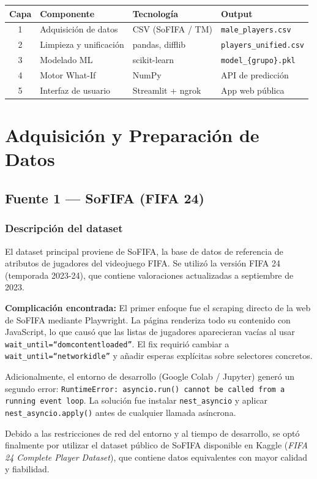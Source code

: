 \documentclass[12pt,a4paper]{report}
\begin{document}
\begin{center}
\begin{tabular}{clll}
\toprule
\textbf{Capa} & \textbf{Componente} & \textbf{Tecnología} & \textbf{Output} \\
\midrule
1 & Adquisición de datos     & CSV (SoFIFA / TM)    & \texttt{male\_players.csv} \\
2 & Limpieza y unificación   & pandas, difflib      & \texttt{players\_unified.csv} \\
3 & Modelado ML              & scikit-learn         & \texttt{model\_\{grupo\}.pkl} \\
4 & Motor What-If            & NumPy                & API de predicción \\
5 & Interfaz de usuario      & Streamlit + ngrok    & App web pública \\
\bottomrule
\end{tabular}
\end{center}


\chapter{Adquisición y Preparación de Datos}

\section{Fuente 1 --- SoFIFA (FIFA 24)}

\subsection{Descripción del dataset}

El dataset principal proviene de SoFIFA, la base de datos de referencia de atributos de jugadores del videojuego FIFA. Se utilizó la versión FIFA 24 (temporada 2023-24), que contiene valoraciones actualizadas a septiembre de 2023.

\begin{warningbox}
\textbf{Complicación encontrada:} El primer enfoque fue el scraping directo de la web de SoFIFA mediante Playwright. La página renderiza todo su contenido con JavaScript, lo que causó que las listas de jugadores aparecieran vacías al usar \texttt{wait\_until=``domcontentloaded''}. El fix requirió cambiar a \texttt{wait\_until=``networkidle''} y añadir esperas explícitas sobre selectores concretos.

Adicionalmente, el entorno de desarrollo (Google Colab / Jupyter) generó un segundo error: \texttt{RuntimeError: asyncio.run() cannot be called from a running event loop}. La solución fue instalar \texttt{nest\_asyncio} y aplicar \texttt{nest\_asyncio.apply()} antes de cualquier llamada asíncrona.

Debido a las restricciones de red del entorno y al tiempo de desarrollo, se optó finalmente por utilizar el dataset público de SoFIFA disponible en Kaggle (\textit{FIFA 24 Complete Player Dataset}), que contiene datos equivalentes con mayor calidad y fiabilidad.
\end{warningbox}
\end{document}
